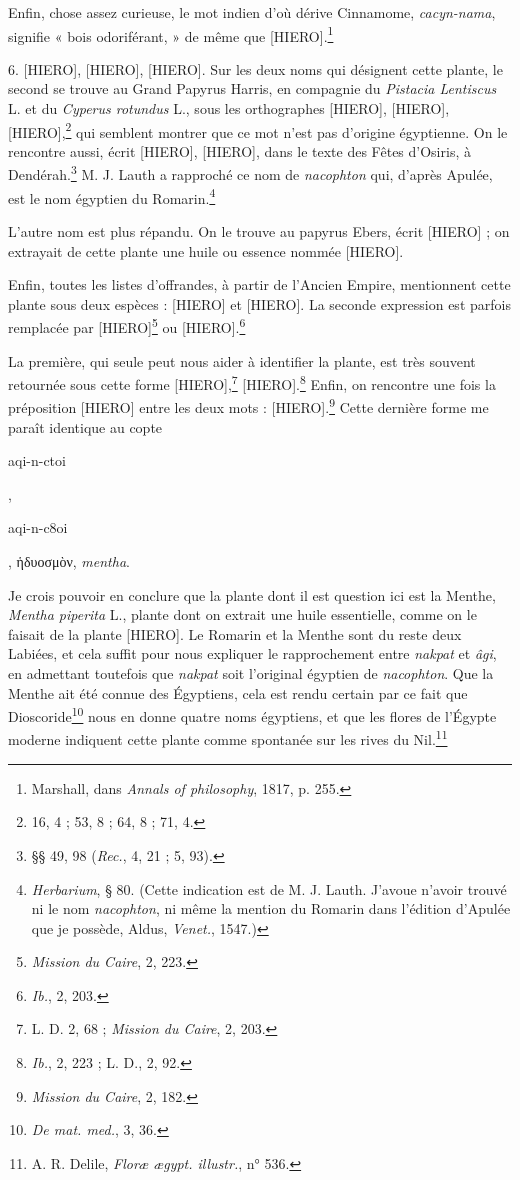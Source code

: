 \documentclass[a4paper, 11pt, oneside]{article}
\begin{document}
Enfin, chose assez curieuse, le mot indien d'où dérive Cinnamome, \emph{cacyn-nama}, signifie « bois odoriférant, » de même que [HIERO].\footnote{Marshall, dans \emph{Annals of philosophy}, 1817, p. 255.}

6. [HIERO], [HIERO], [HIERO]. Sur les deux noms qui désignent cette plante, le second se trouve au Grand Papyrus Harris, en compagnie du \emph{Pistacia Lentiscus} L. et du \emph{Cyperus rotundus} L., sous les orthographes [HIERO], [HIERO], [HIERO],\footnote{16, 4 ; 53, 8 ; 64, 8 ; 71, 4.} qui semblent montrer que ce mot n'est pas d'origine égyptienne. On le rencontre aussi, écrit [HIERO], [HIERO], dans le texte des Fêtes d'Osiris, à Dendérah.\footnote{§§ 49, 98 (\emph{Rec.}, 4, 21 ; 5, 93).} M. J. Lauth a rapproché ce nom de \emph{nacophton} qui, d'après Apulée, est le nom égyptien du Romarin.\footnote{\emph{Herbarium}, § 80. (Cette indication est de M. J. Lauth. J'avoue n'avoir trouvé ni le nom \emph{nacophton}, ni même la mention du Romarin dans l'édition d'Apulée que je possède, Aldus, \emph{Venet.}, 1547.)}

L'autre nom est plus répandu. On le trouve au papyrus Ebers, écrit [HIERO] ; on extrayait de cette plante une huile ou essence nommée [HIERO].

Enfin, toutes les listes d'offrandes, à partir de l'Ancien Empire, mentionnent cette plante sous deux espèces : [HIERO] et [HIERO]. La seconde expression est parfois remplacée par [HIERO]\footnote{\emph{Mission du Caire}, 2, 223.} ou [HIERO].\footnote{\emph{Ib.}, 2, 203.}

La première, qui seule peut nous aider à identifier la plante, est très souvent retournée sous cette forme [HIERO],\footnote{L. D. 2, 68 ; \emph{Mission du Caire}, 2, 203.} [HIERO].\footnote{\emph{Ib.}, 2, 223 ; L. D., 2, 92.} Enfin, on rencontre une fois la préposition [HIERO] entre les deux mots : [HIERO].\footnote{\emph{Mission du Caire}, 2, 182.} Cette dernière forme me paraît identique au copte \begin{coptic}aqi-n-ctoi\end{coptic}, \begin{coptic}aqi-n-c8oi\end{coptic}, ἡδυοσμὸν, \emph{mentha}.

Je crois pouvoir en conclure que la plante dont il est question ici est la Menthe, \emph{Mentha piperita} L., plante dont on extrait une huile essentielle, comme on le faisait de la plante [HIERO]. Le Romarin et la Menthe sont du reste deux Labiées, et cela suffit pour nous expliquer le rapprochement entre \emph{nakpat} et \emph{âgi}, en admettant toutefois que \emph{nakpat} soit l'original égyptien de \emph{nacophton}. Que la Menthe ait été connue des Égyptiens, cela est rendu certain par ce fait que Dioscoride\footnote{\emph{De mat. med.}, 3, 36.} nous en donne quatre noms égyptiens, et que les flores de l'Égypte moderne indiquent cette plante comme spontanée sur les rives du Nil.\footnote{A. R. Delile, \emph{Floræ ægypt. illustr.}, n° 536.}
\end{document}
